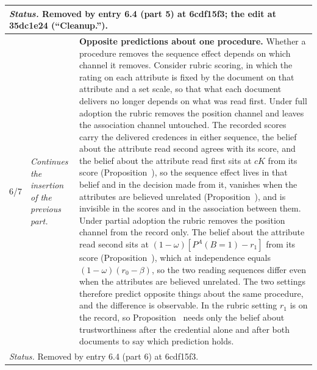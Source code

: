 \documentclass[10pt]{article}
\theoremstyle{definition}
\renewcommand{\ref}[1]{\textsc{\detokenize{#1}}}
\newlength{\fullw}\setlength{\fullw}{25.9cm}
\begin{document}
{\begin{longtable}{|p{0.9cm}|p{12.2cm}|p{12.2cm}|}
\multicolumn{3}{|p{\fullw}|}{\textit{Status.} Removed by entry 6.4 (part 5) at 6cdf15f3; the edit at 35dc1e24 (``Cleanup.'').} \\ \hline
6/7 & \textit{Continues the insertion of the previous part.} & \textbf{Opposite predictions about one procedure.}  Whether a procedure removes the sequence effect depends on which channel it removes. Consider rubric scoring, in which the rating on each attribute is fixed by the document on that attribute and a set scale, so that what each document delivers no longer depends on what was read first. Under full adoption the rubric removes the position channel and leaves the association channel untouched. The recorded scores carry the delivered credences in either sequence, the belief about the attribute read second agrees with its score, and the belief about the attribute read first sits at $cK$ from its score (Proposition~\ref{prop:DRF}), so the sequence effect lives in that belief and in the decision made from it, vanishes when the attributes are believed unrelated (Proposition~\ref{prop:IMM}), and is invisible in the scores and in the association between them. Under partial adoption the rubric removes the position channel from the record only. The belief about the attribute read second sits at $(1-\omega)[P^{A}(B{=}1)-r_1]$ from its score (Proposition~\ref{prop:ADJ}), which at independence equals $(1-\omega)(r_0-\beta)$, so the two reading sequences differ even when the attributes are believed unrelated. The two settings therefore predict opposite things about the same procedure, and the difference is observable. In the rubric setting $r_1$ is on the record, so Proposition~\ref{prop:ADJ} needs only the belief about trustworthiness after the credential alone and after both documents to say which prediction holds. \\ \hline
\multicolumn{3}{|p{\fullw}|}{\textit{Status.} Removed by entry 6.4 (part 6) at 6cdf15f3.} \\ \hline

\end{longtable}}
\end{document}
